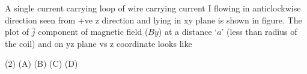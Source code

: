 \item A single current carrying loop of wire carrying current I flowing in anticlockwise direction seen from +ve z direction and lying in xy plane is shown in figure. The plot of $\hat{j }$ component of magnetic field (\(By\)) at a distance ‘\(a\)’ (less than radius of the coil) and on yz plane vs z coordinate looks like
    \begin{center}
    \end{center}
    \begin{tasks}(2)
        \task (A)
        \task (B)
        \task (C)
        \task (D)
    \end{tasks}
